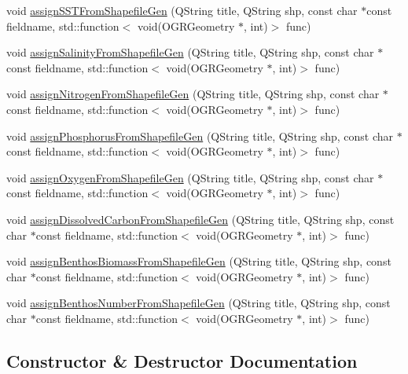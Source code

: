 \begin{DoxyCompactItemize}
\item 
void \mbox{\hyperlink{class_main_window_aba1a2210deb88be61d512b0cde8ff597}{assign\+S\+S\+T\+From\+Shapefile\+Gen}} (Q\+String title, Q\+String shp, const char $\ast$const fieldname, std\+::function$<$ void(O\+G\+R\+Geometry $\ast$, int)$>$ func)
\item 
void \mbox{\hyperlink{class_main_window_ac3721d0f2319228619e205ba735e17de}{assign\+Salinity\+From\+Shapefile\+Gen}} (Q\+String title, Q\+String shp, const char $\ast$const fieldname, std\+::function$<$ void(O\+G\+R\+Geometry $\ast$, int)$>$ func)
\item 
void \mbox{\hyperlink{class_main_window_aa307fe243fed4f412d7f72c4e04d0d8e}{assign\+Nitrogen\+From\+Shapefile\+Gen}} (Q\+String title, Q\+String shp, const char $\ast$const fieldname, std\+::function$<$ void(O\+G\+R\+Geometry $\ast$, int)$>$ func)
\item 
void \mbox{\hyperlink{class_main_window_acee26498d1130667b550bb1e21b1c8fe}{assign\+Phosphorus\+From\+Shapefile\+Gen}} (Q\+String title, Q\+String shp, const char $\ast$const fieldname, std\+::function$<$ void(O\+G\+R\+Geometry $\ast$, int)$>$ func)
\item 
void \mbox{\hyperlink{class_main_window_ae74c7af5315d3d121cbd66e1c9c238c0}{assign\+Oxygen\+From\+Shapefile\+Gen}} (Q\+String title, Q\+String shp, const char $\ast$const fieldname, std\+::function$<$ void(O\+G\+R\+Geometry $\ast$, int)$>$ func)
\item 
void \mbox{\hyperlink{class_main_window_a0d3fb0bf637997275d3d0d1d6363d643}{assign\+Dissolved\+Carbon\+From\+Shapefile\+Gen}} (Q\+String title, Q\+String shp, const char $\ast$const fieldname, std\+::function$<$ void(O\+G\+R\+Geometry $\ast$, int)$>$ func)
\item 
void \mbox{\hyperlink{class_main_window_a88de9882d6c755f8dee4c0a2fa61b190}{assign\+Benthos\+Biomass\+From\+Shapefile\+Gen}} (Q\+String title, Q\+String shp, const char $\ast$const fieldname, std\+::function$<$ void(O\+G\+R\+Geometry $\ast$, int)$>$ func)
\item 
void \mbox{\hyperlink{class_main_window_af1319bf49cc1c89586c47cc92bdab408}{assign\+Benthos\+Number\+From\+Shapefile\+Gen}} (Q\+String title, Q\+String shp, const char $\ast$const fieldname, std\+::function$<$ void(O\+G\+R\+Geometry $\ast$, int)$>$ func)
\end{DoxyCompactItemize}


\subsection{Constructor \& Destructor Documentation}
\mbox{\label{class_main_window_a8b244be8b7b7db1b08de2a2acb9409db}} 
